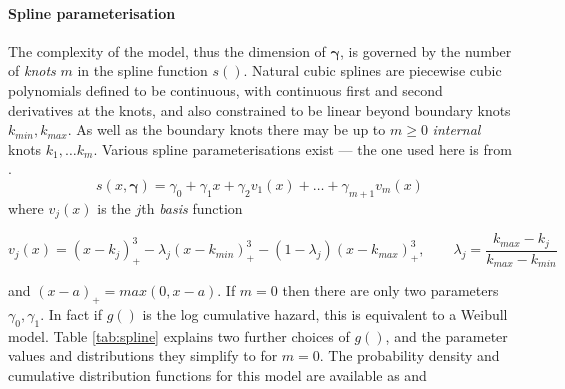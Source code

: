 \documentclass[nojss,nofooter]{jss}
\begin{document}
\paragraph{Spline parameterisation}
The complexity of the model, thus the dimension of $\bm{\gamma}$, is
governed by the number of \emph{knots} $m$ in the spline function
$s()$.  Natural cubic splines are piecewise cubic polynomials defined
to be continuous, with continuous first and second derivatives at the
knots, and also constrained to be linear beyond boundary knots
$k_{min},k_{max}$.  As well as the boundary knots there may be up to
$m\geq 0$ \emph{internal} knots $k_1,\ldots k_m$.  Various spline
parameterisations exist --- the one used here is from
\citet{royston:parmar}.
\begin{equation}
  \label{eq:spline}
  s(x,\bm{\gamma}) = \gamma_0 + \gamma_1 x + \gamma_2 v_1(x) + \ldots + \gamma_{m+1} v_m(x)   
\end{equation}
where $v_j(x)$ is the $j$th \emph{basis} function

\[v_j(x) = (x - k_j)^3_+ - \lambda_j(x - k_{min})^3_+ - (1 - \lambda_j) (x - k_{max})^3_+, 
\qquad
\lambda_j = \frac{k_{max} - k_j}{k_{max} - k_{min}} \] 

and $(x - a)_+ = max(0, x - a)$.  If $m=0$ then there are only two
parameters $\gamma_0,\gamma_1$.  In fact if $g()$ is the log
cumulative hazard, this is equivalent to a Weibull model.  Table
\ref{tab:spline} explains two further choices of $g()$, and the
parameter values and distributions they simplify to for $m=0$.  
The probability density and cumulative distribution functions
for this model are available as  and 

\begin{Scode}
  
\end{Scode}
  
\end{document}
